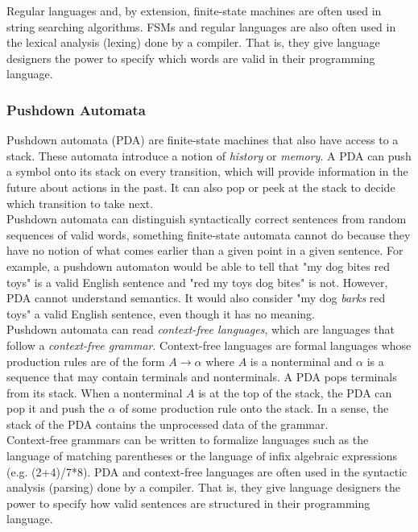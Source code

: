 Regular languages and, by extension, finite-state machines are often used in string searching algorithms. FSMs and regular languages are also often used in the lexical analysis (lexing) done by a compiler. That is, they give language designers the power to specify which words are valid in their programming language. \\

\subsubsection{Pushdown Automata}

Pushdown automata (PDA) are finite-state machines that also have access to a stack. These automata introduce a notion of \textit{history} or \textit{memory}. A PDA can push a symbol onto its stack on every transition, which will provide information in the future about actions in the past. It can also pop or peek at the stack to decide which transition to take next. \\

Pushdown automata can distinguish syntactically correct sentences from random sequences of valid words, something finite-state automata cannot do because they have no notion of what comes earlier than a given point in a given sentence. For example, a pushdown automaton would be able to tell that "my dog bites red toys" is a valid English sentence and "red my toys dog bites" is not. However, PDA cannot understand semantics. It would also consider "my dog \textit{barks} red toys" a valid English sentence, even though it has no meaning. \\

Pushdown automata can read \textit{context-free languages}, which are languages that follow a \textit{context-free grammar}. Context-free languages are formal languages whose production rules are of the form $A\rightarrow\alpha$ where $A$ is a nonterminal and $\alpha$ is a sequence that may contain terminals and nonterminals. A PDA pops terminals from its stack. When a nonterminal $A$ is at the top of the stack, the PDA can pop it and push the $\alpha$ of some production rule onto the stack. In a sense, the stack of the PDA contains the unprocessed data of the grammar. \\

Context-free grammars can be written to formalize languages such as the language of matching parentheses or the language of infix algebraic expressions (e.g. (2+4)/7*8). PDA and context-free languages are often used in the syntactic analysis (parsing) done by a compiler. That is, they give language designers the power to specify how valid sentences are structured in their programming language. \\

